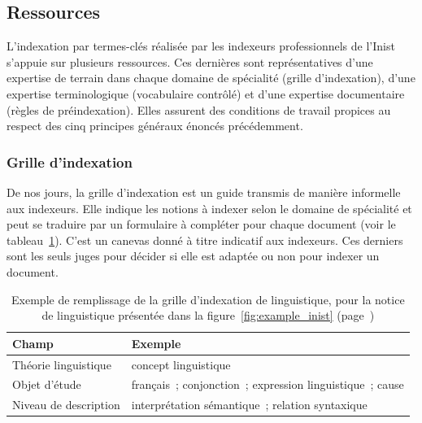     \subsection{Ressources}
    \label{subsec:main-domain_specific_keyphrase_annotation-manual_keyphrase_annotation-resources}
      L'indexation par termes-clés réalisée par les indexeurs professionnels de
      l'Inist s'appuie sur plusieurs ressources. Ces dernières sont
      représentatives d'une expertise de terrain dans chaque domaine de
      spécialité (grille d'indexation), d'une expertise terminologique
      (vocabulaire contrôlé) et d'une expertise documentaire (règles de
      préindexation). Elles assurent des conditions de travail propices
      au respect des cinq principes généraux énoncés précédemment.

      \subsubsection{Grille d'indexation}
      \label{subsubsec:main-domain_specific_keyphrase_annotation-manual_keyphrase_annotation-resources-indexing_guidelines}
        De nos jours, la grille d'indexation est un guide transmis de manière
        informelle aux indexeurs. Elle indique les notions à indexer selon le
        domaine de spécialité et peut se traduire par un formulaire à compléter
        pour chaque document (voir le tableau~\ref{fig:indexing_grid}). C'est un
        canevas donné à titre indicatif aux indexeurs. Ces derniers sont les
        seuls juges pour décider si elle est adaptée ou non pour indexer un
        document.
        \begin{table}[h!]
          \centering
          \begin{tabular}{l|l}
            \toprule
            \textbf{Champ} & \textbf{Exemple}\\
            \hline
            Théorie linguistique & concept linguistique\\
            Objet d'étude & français~; conjonction~; expression linguistique~; cause\\
            Niveau de description & interprétation sémantique~; relation syntaxique\\
            \bottomrule
          \end{tabular}
          \caption[
            Exemple de remplissage de la grille d'indexation de linguistique
          ]{
            Exemple de remplissage de la grille d'indexation de linguistique,
            pour la notice de linguistique présentée dans la
            figure~\ref{fig:example_inist} (page~\pageref{fig:example_inist})
            \label{fig:indexing_grid}
          }
        \end{table}

